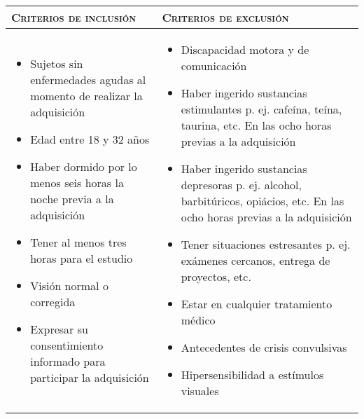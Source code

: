 	\begin{tabular}{p{}|p{}}
		\textsc{Criterios de inclusión}& \textsc{Criterios de exclusión}\\
		\hline\hline
		\begin{itemize}
			\item Sujetos sin enfermedades agudas al momento de realizar la adquisición
			\item Edad entre 18 y 32 años
			\item Haber dormido por lo menos seis horas la noche previa a la adquisición
			\item Tener al menos tres horas para el estudio
			\item Visión normal o corregida
			\item Expresar su consentimiento informado para participar la adquisición
		\end{itemize}&
		\begin{itemize}
			\item Discapacidad motora y de comunicación
			\item Haber ingerido sustancias estimulantes p. ej. cafeína, teína, taurina, etc. En las ocho horas previas a la adquisición
			\item Haber ingerido sustancias depresoras p. ej. alcohol, barbitúricos, opiácios, etc. En las ocho horas previas a la adquisición
			\item Tener situaciones estresantes p. ej. exámenes cercanos, entrega de proyectos, etc.
			\item Estar en cualquier tratamiento médico
			\item Antecedentes de crisis convulsivas
			\item Hipersensibilidad a estímulos visuales
		\end{itemize}\\
	\hline\hline
	\end{tabular}

